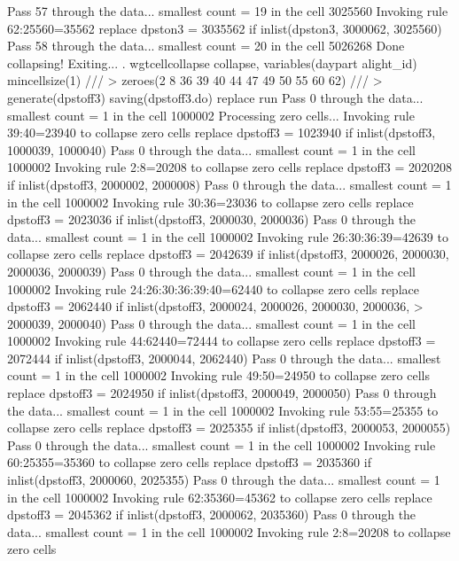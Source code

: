 Pass 57 through the data...
  smallest count = 19 in the cell      3025560
  Invoking rule 62:25560=35562
  replace dpston3 = 3035562 if inlist(dpston3, 3000062, 3025560)
Pass 58 through the data...
  smallest count = 20 in the cell      5026268
  Done collapsing! Exiting...
{\smallskip}
. wgtcellcollapse collapse, variables(daypart alight_id) mincellsize(1) ///
>         zeroes(2 8 36 39 40 44 47 49 50 55 60 62) ///
>         generate(dpstoff3) saving(dpstoff3.do) replace run
Pass 0 through the data...
  smallest count = 1 in the cell      1000002
{\smallskip}
Processing zero cells...
{\smallskip}
  Invoking rule 39:40=23940 to collapse zero cells
  replace dpstoff3 = 1023940 if inlist(dpstoff3, 1000039, 1000040)
Pass 0 through the data...
  smallest count = 1 in the cell      1000002
  Invoking rule 2:8=20208 to collapse zero cells
  replace dpstoff3 = 2020208 if inlist(dpstoff3, 2000002, 2000008)
Pass 0 through the data...
  smallest count = 1 in the cell      1000002
  Invoking rule 30:36=23036 to collapse zero cells
  replace dpstoff3 = 2023036 if inlist(dpstoff3, 2000030, 2000036)
Pass 0 through the data...
  smallest count = 1 in the cell      1000002
  Invoking rule 26:30:36:39=42639 to collapse zero cells
  replace dpstoff3 = 2042639 if inlist(dpstoff3, 2000026, 2000030, 2000036, 2000039)
Pass 0 through the data...
  smallest count = 1 in the cell      1000002
  Invoking rule 24:26:30:36:39:40=62440 to collapse zero cells
  replace dpstoff3 = 2062440 if inlist(dpstoff3, 2000024, 2000026, 2000030, 2000036,
>  2000039, 2000040)
Pass 0 through the data...
  smallest count = 1 in the cell      1000002
  Invoking rule 44:62440=72444 to collapse zero cells
  replace dpstoff3 = 2072444 if inlist(dpstoff3, 2000044, 2062440)
Pass 0 through the data...
  smallest count = 1 in the cell      1000002
  Invoking rule 49:50=24950 to collapse zero cells
  replace dpstoff3 = 2024950 if inlist(dpstoff3, 2000049, 2000050)
Pass 0 through the data...
  smallest count = 1 in the cell      1000002
  Invoking rule 53:55=25355 to collapse zero cells
  replace dpstoff3 = 2025355 if inlist(dpstoff3, 2000053, 2000055)
Pass 0 through the data...
  smallest count = 1 in the cell      1000002
  Invoking rule 60:25355=35360 to collapse zero cells
  replace dpstoff3 = 2035360 if inlist(dpstoff3, 2000060, 2025355)
Pass 0 through the data...
  smallest count = 1 in the cell      1000002
  Invoking rule 62:35360=45362 to collapse zero cells
  replace dpstoff3 = 2045362 if inlist(dpstoff3, 2000062, 2035360)
Pass 0 through the data...
  smallest count = 1 in the cell      1000002
  Invoking rule 2:8=20208 to collapse zero cells

